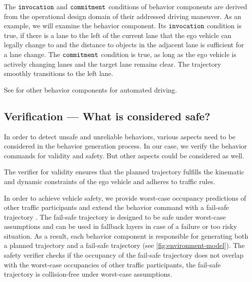 The $\texttt{invocation}$ and $\texttt{commitment}$ conditions of behavior components are derived from the operational design domain of their addressed driving maneuver.
%
As an example, we will examine the  behavior component.
Its $\texttt{invocation}$ condition is true,
if there is a lane to the left of the current lane that the ego vehicle can legally change to and the distance to objects in the adjacent lane is sufficient for a lane change.
The $\texttt{commitment}$ condition is true, as long as the ego vehicle is actively changing lanes
and the target lane remains clear.
The trajectory smoothly transitions to the left lane.

See \cite{orzechowskiVerhaltensentscheidungFuerAutomatisierte2023} for other behavior components for automated driving.






\subsection{Verification --- What is considered \textbf{safe}?}

In order to detect unsafe and unreliable behaviors,
various aspects need to be considered in the behavior generation process.
%
In our case, we verify the behavior commands for validity and safety.
But other aspects could be considered as well.

The verifier for validity ensures that the planned trajectory fulfills the kinematic and dynamic constraints of the ego vehicle
and adheres to traffic rules.

In order to achieve vehicle safety, we
provide worst-case occupancy predictions of other traffic participants
and extend the behavior command with a fail-safe trajectory \cite{althoffSetBasedPredictionTraffic2016}.
The fail-safe trajectory is designed to be safe under worst-case assumptions
and can be used in fallback layers in case of a failure or too risky situation.
As a result, each behavior component is responsible for generating both
a planned trajectory and a fail-safe trajectory (see \cref{fig:environment-model}).
The safety verifier checks if the occupancy of the fail-safe trajectory does not overlap
with the worst-case occupancies of other traffic participants,
\ie the fail-safe trajectory is collision-free under worst-case assumptions.



